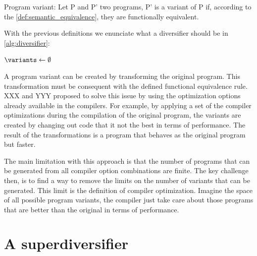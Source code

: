 \begin{definition}{Program variant:}
    \label{def:variant}
    Let P and P' two programs, P' is a variant of P if, according to the \autoref{def:semantic_equivalence}, they are functionally equivalent.
\end{definition}
    

With the previous definitions we enunciate what a diversifier should be in \autoref{alg:diversifier}:


\begin{algorithm}[H]

    $\variants \leftarrow \emptyset$ \;
    
    \caption{Program diversifier}
\label{alg:diversifier}

\end{algorithm}

A program variant can be created by transforming the original program. This transformation must be consequent with the defined functional equivalence rule. 
XXX and YYY proposed to solve this issue by using the optimization options already available in the compilers. For example, by applying a set of the compiler optimizations during the compilation of the original program, the variants are created by changing out code that it not the best in terms of performance. The result of the transformations is a program that behaves as the original program but faster. 

The main limitation with this approach is that the number of programs that can be generated from all compiler option combinations are finite. The key challenge then, is to find a way to remove the limits on the number of variants that can be generated. This limit is the definition of compiler optimization.  Imagine the space of all possible program variants, the compiler just take care about those programs that are better than the original in terms of performance.


\section{A superdiversifier}

